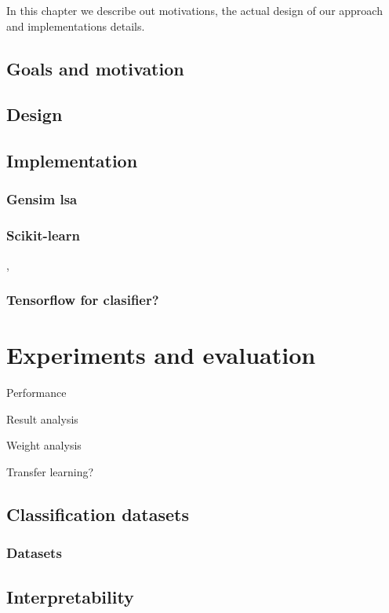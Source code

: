     In this chapter we describe out motivations, the actual design of our approach and implementations details.
    
    \section{Goals and motivation}
    
    \section{Design}
    
    
    
    \section{Implementation}
        \cite{bird2009natural} %
        
        \subsection{Gensim lsa}
        \cite{rehurek_lrec}
        
        \subsection{Scikit-learn}
        \cite{sklearn_api},
        \cite{scikit-learn}
        
        \subsection{Tensorflow for clasifier?}
    \*

\chapter{Experiments and evaluation}

    Performance
    
    Result analysis
    
    Weight analysis
    
    Transfer learning?

    \section{Classification datasets}
        \subsection{Datasets}
            \cite{conneau2017supervised} %

    \section{Interpretability}
        \cite{ribeiro2016should} %



